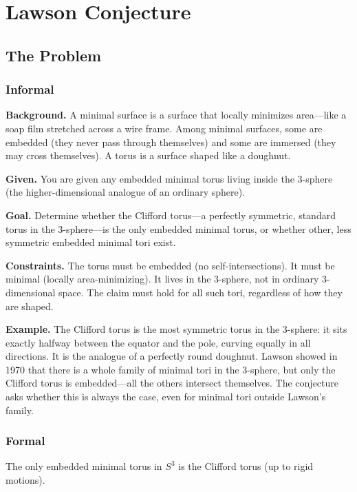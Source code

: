 \let\LocalMacro\relax

\chapter{Lawson Conjecture}

\section{The Problem}

\subsection{Informal}

\textbf{Background.} A minimal surface is a surface that locally minimizes area---like a soap film stretched across a wire frame. Among minimal surfaces, some are embedded (they never pass through themselves) and some are immersed (they may cross themselves). A torus is a surface shaped like a doughnut.

\textbf{Given.} You are given any embedded minimal torus living inside the 3-sphere (the higher-dimensional analogue of an ordinary sphere).

\textbf{Goal.} Determine whether the Clifford torus---a perfectly symmetric, standard torus in the 3-sphere---is the only embedded minimal torus, or whether other, less symmetric embedded minimal tori exist.

\textbf{Constraints.} The torus must be embedded (no self-intersections). It must be minimal (locally area-minimizing). It lives in the 3-sphere, not in ordinary 3-dimensional space. The claim must hold for all such tori, regardless of how they are shaped.

\textbf{Example.} The Clifford torus is the most symmetric torus in the 3-sphere: it sits exactly halfway between the equator and the pole, curving equally in all directions. It is the analogue of a perfectly round doughnut. Lawson showed in 1970 that there is a whole family of minimal tori in the 3-sphere, but only the Clifford torus is embedded---all the others intersect themselves. The conjecture asks whether this is always the case, even for minimal tori outside Lawson's family.

\subsection{Formal}
\begin{conjecture}[Lawson, 1970]
The only embedded minimal torus in $S^3$ is the Clifford torus (up to rigid motions).
\end{conjecture}

